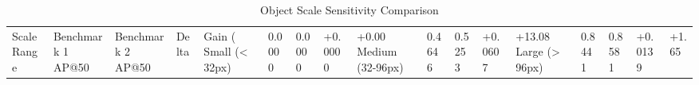 \begin{table}
\caption{Object Scale Sensitivity Comparison}
\label{tab:scale_comp}
\begin{tabular}{lllll}
\toprule
Scale Range & Benchmark 1 AP@50 & Benchmark 2 AP@50 & Delta & Gain (%
\midrule
Small (< 32px) & 0.0000 & 0.0000 & +0.0000 & +0.00%
Medium (32-96px) & 0.4646 & 0.5253 & +0.0607 & +13.08%
Large (> 96px) & 0.8441 & 0.8581 & +0.0139 & +1.65%
\bottomrule
\end{tabular}
\end{table}
